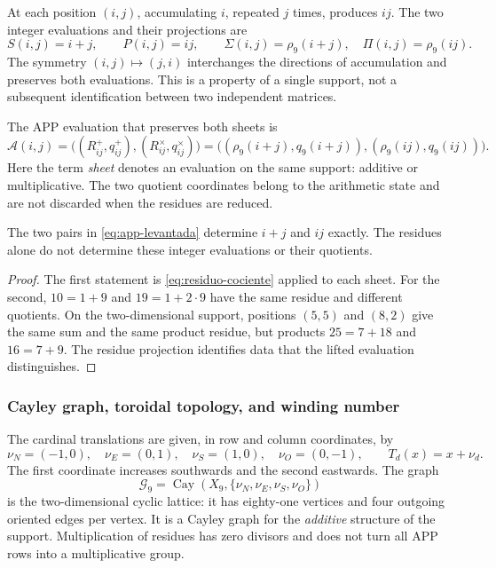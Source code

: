 At each position \((i,j)\), accumulating \(i\), repeated \(j\) times, produces \(ij\). The two integer evaluations and their projections are
\[
 S(i,j)=i+j,\qquad P(i,j)=ij,\qquad
 \Sigma(i,j)=\rho_9(i+j),\quad \Pi(i,j)=\rho_9(ij).
\]
The symmetry \((i,j)\mapsto(j,i)\) interchanges the directions of accumulation and preserves both evaluations. This is a property of a single support, not a subsequent identification between two independent matrices.

\begin{definition}
The APP evaluation that preserves both sheets is
\begin{equation}
 \mathcal A(i,j)=
 \bigl((R^+_{ij},q^+_{ij}),(R^\times_{ij},q^\times_{ij})\bigr)
 =\bigl((\rho_9(i+j),q_9(i+j)),(\rho_9(ij),q_9(ij))\bigr).
 \label{eq:app-levantada}
\end{equation}
Here the term \emph{sheet} denotes an evaluation on the same support: additive or multiplicative. The two quotient coordinates belong to the arithmetic state and are not discarded when the residues are reduced.
\end{definition}



\begin{proposition}
The two pairs in \eqref{eq:app-levantada} determine \(i+j\) and \(ij\) exactly. The residues alone do not determine these integer evaluations or their quotients.
\end{proposition}
\begin{proof}
The first statement is \eqref{eq:residuo-cociente} applied to each sheet. For the second, \(10=1+9\) and \(19=1+2\cdot9\) have the same residue and different quotients. On the two-dimensional support, positions \((5,5)\) and \((8,2)\) give the same sum and the same product residue, but products \(25=7+18\) and \(16=7+9\). The residue projection identifies data that the lifted evaluation distinguishes.
\end{proof}

\subsubsection{Cayley graph, toroidal topology, and winding number}

The cardinal translations are given, in row and column coordinates, by
\[
 \nu_N=(-1,0),\quad\nu_E=(0,1),\quad
 \nu_S=(1,0),\quad\nu_O=(0,-1),\qquad T_d(x)=x+\nu_d.
\]
The first coordinate increases southwards and the second eastwards. The graph
\[
 \mathscr G_9=\operatorname{Cay}(X_9,\{\nu_N,\nu_E,\nu_S,\nu_O\})
\]
is the two-dimensional cyclic lattice: it has eighty-one vertices and four outgoing oriented edges per vertex. It is a Cayley graph for the \emph{additive} structure of the support. Multiplication of residues has zero divisors and does not turn all APP rows into a multiplicative group.

